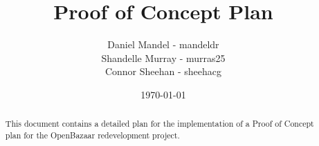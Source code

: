 \documentclass{article}
\begin{document}
\title{Proof of Concept Plan}
\author{Daniel Mandel - mandeldr \\ Shandelle Murray - murras25 \\ Connor Sheehan - sheehacg}
\date{\today}
\maketitle

\begin{abstract}
This document contains a detailed plan for the implementation of a Proof of Concept plan for the OpenBazaar redevelopment project.
\end{abstract}

\section{}
\end{document}
